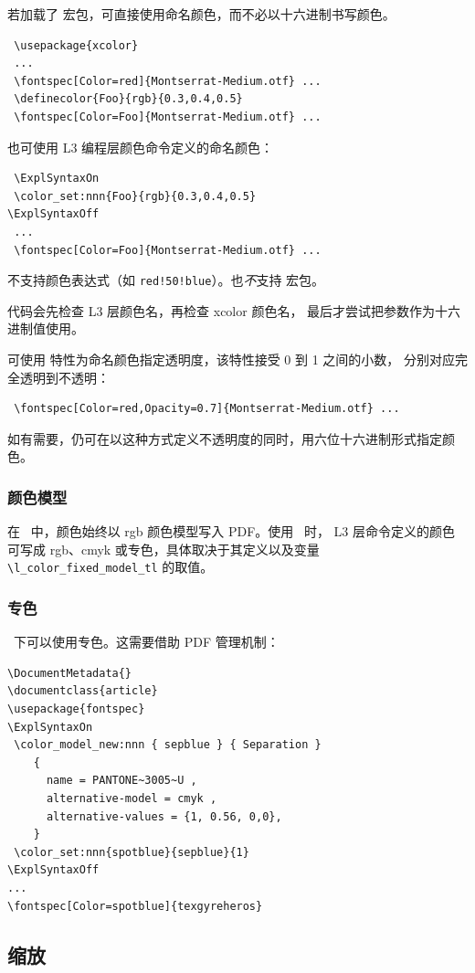 \documentclass[a4paper]{l3doc}
\begin{document}
若加载了  宏包，可直接使用命名颜色，而不必以十六进制书写颜色。
\begin{Verbatim}
 \usepackage{xcolor}
 ...
 \fontspec[Color=red]{Montserrat-Medium.otf} ...
 \definecolor{Foo}{rgb}{0.3,0.4,0.5}
 \fontspec[Color=Foo]{Montserrat-Medium.otf} ...
\end{Verbatim}

也可使用 L3 编程层颜色命令定义的命名颜色：
\begin{Verbatim}
 \ExplSyntaxOn
 \color_set:nnn{Foo}{rgb}{0.3,0.4,0.5}
\ExplSyntaxOff
 ...
 \fontspec[Color=Foo]{Montserrat-Medium.otf} ...
\end{Verbatim}

不支持颜色表达式（如 \verb+red!50!blue+）。也\emph{不}支持  宏包。

代码会先检查 L3 层颜色名，再检查 xcolor 颜色名，
最后才尝试把参数作为十六进制值使用。

可使用  特性为命名颜色指定透明度，该特性接受 0 到 1 之间的小数，
分别对应完全透明到不透明：
\begin{Verbatim}
 \fontspec[Color=red,Opacity=0.7]{Montserrat-Medium.otf} ...
\end{Verbatim}
如有需要，仍可在以这种方式定义不透明度的同时，用六位十六进制形式指定颜色。

\subsubsection{颜色模型}

在 \XeTeX\ 中，颜色始终以 rgb 颜色模型写入 PDF。使用 \LuaTeX\ 时，
L3 层命令定义的颜色可写成 rgb、cmyk 或专色，具体取决于其定义以及变量
\verb+\l_color_fixed_model_tl+ 的取值。

\subsubsection{专色}
\LuaTeX\ 下可以使用专色。这需要借助 PDF 管理机制：
\begin{Verbatim}
\DocumentMetadata{}
\documentclass{article}
\usepackage{fontspec}
\ExplSyntaxOn
 \color_model_new:nnn { sepblue } { Separation }
    {
      name = PANTONE~3005~U ,
      alternative-model = cmyk ,
      alternative-values = {1, 0.56, 0,0},
    }
 \color_set:nnn{spotblue}{sepblue}{1}
\ExplSyntaxOff
...
\fontspec[Color=spotblue]{texgyreheros}
\end{Verbatim}



\subsection{缩放}
\end{document}
